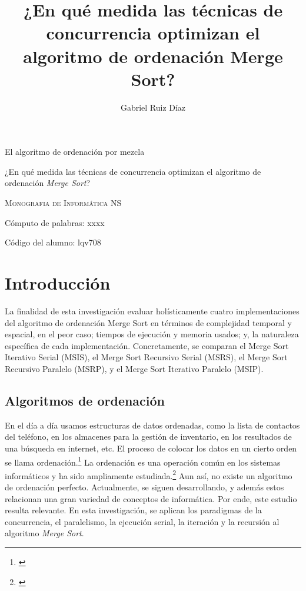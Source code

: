 \documentclass[titlepage]{article}
\title{¿En qué medida las técnicas de concurrencia optimizan el algoritmo de ordenación Merge Sort?}
\author{Gabriel Ruiz Díaz}
\date{}
\begin{document}
\begin{titlepage}
\centering
{\hfill}
\vspace{3cm}

{\Huge El algoritmo de ordenación por mezcla\par}
\vspace{2cm}
{\LARGE ¿En qué medida las técnicas de concurrencia optimizan el algoritmo de ordenación \textit{Merge Sort}? \par}
\vspace{1cm}
{\scshape\large Monografia de Informática NS \par}
\vspace{8cm}


{\Large Cómputo de palabras: xxxx \par}
{\Large Código del alumno: lqv708 \par}
\end{titlepage}

\newpage
\tableofcontents

\newpage
\section{Introducción}
La finalidad de esta investigación evaluar holísticamente cuatro implementaciones del algoritmo de ordenación Merge Sort en términos de complejidad temporal y espacial, en el peor caso; tiempos de ejecución y memoria usados; y, la naturaleza específica de cada implementación. Concretamente, se comparan el Merge Sort Iterativo Serial (MSIS), el Merge Sort Recursivo Serial (MSRS), el Merge Sort Recursivo Paralelo (MSRP), y el Merge Sort Iterativo Paralelo (MSIP).


\subsection{Algoritmos de ordenación}
En el día a día usamos estructuras de datos ordenadas, como la lista de contactos del teléfono, en los almacenes para la gestión de inventario, en los resultados de una búsqueda en internet, etc. El proceso de colocar los datos en un cierto orden se llama ordenación.\footnote{\cite{knuth-1997}} La ordenación es una operación común en los sistemas informáticos y ha sido ampliamente estudiada.\footnote{\cite{McMillan-2007}} Aun así, no existe un algoritmo de ordenación perfecto. Actualmente, se siguen desarrollando, y además estos relacionan una gran variedad de conceptos de informática. Por ende, este estudio resulta relevante. En esta investigación, se aplican los paradigmas de la concurrencia, el paralelismo, la ejecución serial, la iteración y la recursión al algoritmo \textit{Merge Sort}.
\end{document}
